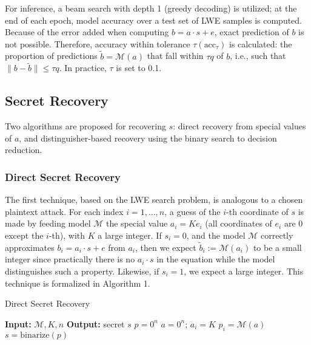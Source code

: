 \documentclass{article}
\begin{document}
For inference, a beam search with depth 1 (greedy decoding) is utilized; at the end of each epoch, model accuracy over a test set of LWE samples is computed. Because of the error added when computing \( b = a \cdot s + e \), exact prediction of \( b \) is not possible. Therefore, accuracy within tolerance \( \tau (\text{acc}_\tau) \) is calculated: the proportion of predictions \( \tilde{b} = \mathcal{M}(a) \) that fall within \( \tau q \) of \( b \), i.e., such that \( \| b - \tilde{b} \| \leq \tau q \). In practice, \( \tau \) is set to 0.1.

\subsection{Secret Recovery}
Two algorithms are proposed for recovering \( s \): direct recovery from special values of \( a \), and distinguisher-based recovery using the binary search to decision reduction.

\subsubsection{Direct Secret Recovery}

The first technique, based on the LWE search problem, is analogous to a chosen plaintext attack. For each index \( i = 1, \ldots, n \), a guess of the \( i \)-th coordinate of \( s \) is made by feeding model \( \mathcal{M} \) the special value \( a_i = K e_i \) (all coordinates of \( e_i \) are 0 except the \( i \)-th), with \( K \) a large integer. If \( s_i = 0 \), and the model \( \mathcal{M} \) correctly approximates \( b_i = a_i \cdot s + e \) from \( a_i \), then we expect \( \tilde{b}_i := \mathcal{M}(a_i) \) to be a small integer since practically there is no \( a_i \cdot s \) in the equation while the model distinguishes such a property. Likewise, if \( s_i = 1 \), we expect a large integer. This technique is formalized in Algorithm 1.

\begin{algorithm}[H]
\caption{Direct Secret Recovery}
\begin{algorithmic}[1]
    \State \textbf{Input:} \( \mathcal{M}, K, n \)
    \State \textbf{Output:} secret \( s \)
    \State \( p = 0^n \)
        \State \( a = 0^n \); \( a_i = K \)
        \State \( p_i = \mathcal{M}(a) \)
    \EndFor
    \State \Return \( s = \text{binarize}(p) \)
\end{algorithmic}
\end{algorithm}
\end{document}
